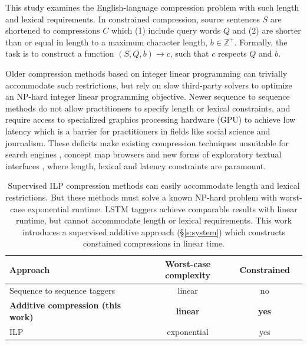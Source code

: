\documentclass[11pt,a4paper]{article}
\begin{document}
This study examines the English-language compression problem with such length and lexical requirements. In constrained compression, source sentences $S$ are shortened to compressions $C$ which (1) include query words $Q$ and (2) are shorter than or equal in length to a maximum character length, $b \in \mathbb{Z}^{+}$. Formally, the task is to construct a function $(S,Q,b) \rightarrow c$, such that $c$ respects $Q$ and $b$.

Older compression methods  \cite{clarke2008global,filippova2013overcoming} based on integer linear programming can trivially accommodate such restrictions, but rely on slow third-party solvers to optimize an NP-hard integer linear programming objective\label{s:relatedwork}. Newer sequence to sequence methods \cite{filippova2015sentence} do not allow practitioners to specify length or lexical constraints, and require access to specialized graphics processing hardware (GPU) to achieve low latency which is a barrier for practitioners in fields like social science and journalism. These deficits make existing compression techniques unsuitable for search engines \cite{hearst2009search}, concept map browsers \cite{falke2017graphdocexplore} and new forms of exploratory textual interfaces \cite{marchionini2006exploratory}, where length, lexical and latency constraints are paramount. 

\begin{table}[htb!]
\begin{tabular}{lccc}
\textbf{Approach} & \textbf{Worst-case complexity} & \textbf{Constrained}  \\ \hline
Sequence to sequence taggers \cite{filippova2015sentence}   & linear              & no         \\   
\textbf{Additive compression (this work)}  & \textbf{linear}     &      \textbf{yes}   \\
ILP    \cite{filippova2013overcoming,Wang2017CanSH}       &   exponential    & yes      \\
\end{tabular}
\caption{Supervised ILP compression methods \cite{clarke2008global,filippova2013overcoming,Wang2017CanSH} can easily accommodate length and lexical restrictions. But these methods must solve a known NP-hard problem with worst-case exponential runtime. LSTM taggers \cite{filippova2015sentence} achieve comparable results with linear runtime, but cannot accommodate length or lexical requirements. This work introduces a supervised additive approach (\S\ref{s:system}) which constructs constained compressions in linear time.} 
\label{t:algos}
\end{table}
\end{document}
